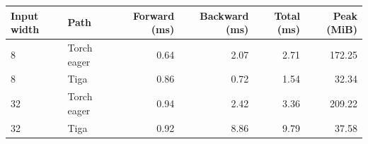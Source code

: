 \begin{tabular}{llrrrr}
\toprule
Input width & Path & Forward (ms) & Backward (ms) & Total (ms) & Peak (MiB) \\
\midrule
8 & Torch eager & 0.64 & 2.07 & 2.71 & 172.25 \\
8 & Tiga & 0.86 & 0.72 & 1.54 & 32.34 \\
32 & Torch eager & 0.94 & 2.42 & 3.36 & 209.22 \\
32 & Tiga & 0.92 & 8.86 & 9.79 & 37.58 \\
\bottomrule
\end{tabular}
